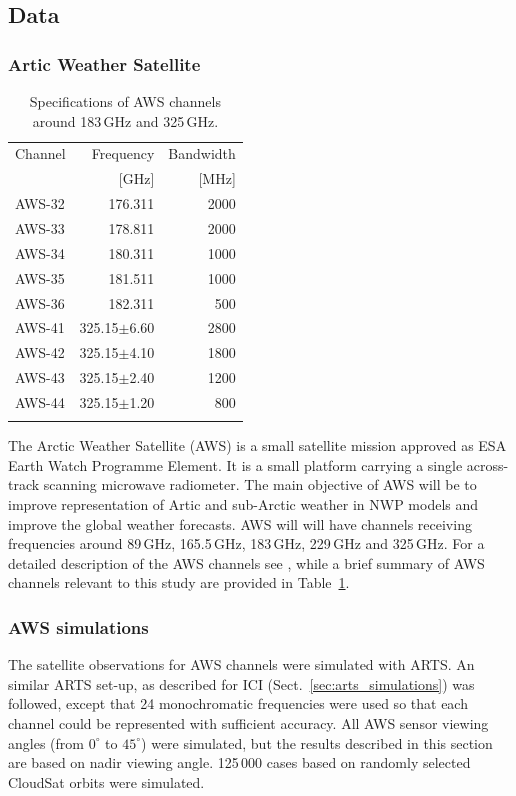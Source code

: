 \documentclass[amt, manuscript]{copernicus}
\begin{document}
\subsection{Data}
\subsubsection{Artic Weather Satellite}
\begin{table}[t]
	\caption{Specifications of AWS channels around 183\,GHz and 325\,GHz.}
	\label{tab:specifications_AWS}	
	\begin{tabular}{lrr}
		\tophline
		Channel & Frequency 	& Bandwidth  \\
		& [GHz]			& [MHz]		\\
		\middlehline
		AWS-32	&	176.311    & 2000 		\\
		AWS-33	&	178.811    & 2000 		\\
		AWS-34	&	180.311    & 1000 		\\
		AWS-35	&	181.511    & 1000 		 \\
		AWS-36	&	182.311    & \phantom{0}500 	 \\
		AWS-41    & 325.15$\pm$6.60    & 2800 \\
		AWS-42    & 325.15$\pm$4.10    & 1800  \\
		AWS-43    & 325.15$\pm$2.40    & 1200 \\
		AWS-44    & 325.15$\pm$1.20    & \phantom{0}800  \\
		\bottomhline
	\end{tabular}
	\belowtable{} %
\end{table}

The Arctic Weather Satellite (AWS) is a small satellite mission approved as ESA
Earth Watch Programme Element. It is a small platform carrying a single
across-track scanning microwave radiometer. The main objective of AWS will be
to improve representation of Artic and sub-Arctic weather in NWP models and
improve the global weather forecasts. AWS will will have channels receiving
frequencies around 89\,GHz, 165.5\,GHz, 183\,GHz, 229\,GHz and 325\,GHz. For a
detailed description of the AWS channels see \citet{eriksson2020study}, while a
brief summary of AWS channels relevant to this study are provided in
Table~\ref{tab:specifications_AWS}.



\subsubsection{AWS simulations}
The satellite observations for AWS channels were simulated with ARTS. An similar ARTS set-up, as described for ICI (Sect.~\ref{sec:arts_simulations}) was followed, except that 24 monochromatic frequencies were used so that each channel could be represented with sufficient accuracy. All AWS sensor viewing angles (from $0^\circ$ to $45^\circ$) were simulated, but the results described in this section are based on nadir viewing angle. 125\,000 cases based on randomly selected CloudSat orbits were simulated.
\end{document}
